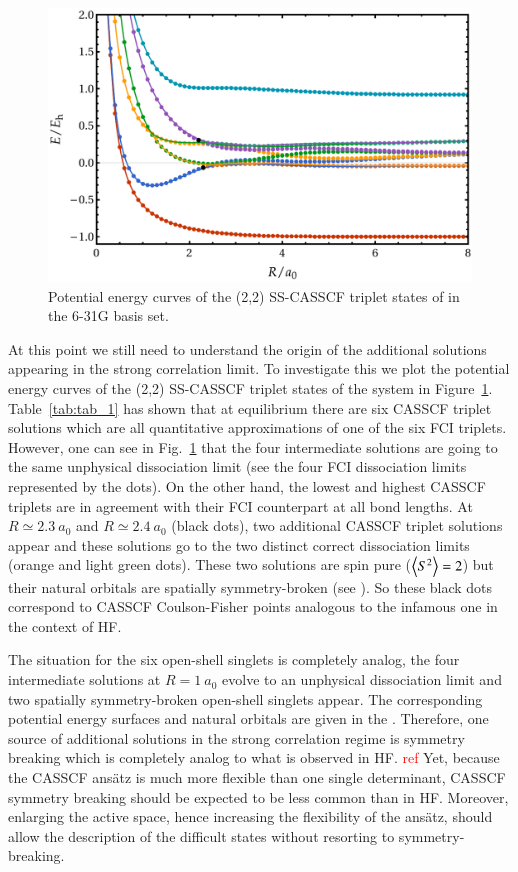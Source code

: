 \documentclass[aip,jcp,reprint,noshowkeys,superscriptaddress]{revtex4-1}
\newcommand{\todo}[1]{\textcolor{red}{#1}}
\begin{document}
\begin{figure}
  \centering
  \includegraphics[width=0.9\linewidth]{Figures/fig_6.pdf}
  \caption{Potential energy curves of the (2,2) SS-CASSCF triplet states of  in the 6-31G basis set. \label{fig:fig_8}}
\end{figure}

At this point we still need to understand the origin of the additional solutions appearing in the strong correlation limit.
To investigate this we plot the potential energy curves of the (2,2) SS-CASSCF triplet states of the system in Figure~\ref{fig:fig_8}.
Table~\ref{tab:tab_1} has shown that at equilibrium there are six CASSCF triplet solutions which are all quantitative approximations of one of the six FCI triplets.
However, one can see in Fig.~\ref{fig:fig_8} that the four intermediate solutions are going to the same unphysical dissociation limit (see the four FCI dissociation limits represented by the dots).
On the other hand, the lowest and highest CASSCF triplets are in agreement with their FCI counterpart at all bond lengths.
At $R\simeq 2.3~a_0$ and $R\simeq 2.4~a_0$ (black dots), two additional CASSCF triplet solutions appear and these solutions go to the two distinct correct dissociation limits (orange and light green dots).
These two solutions are spin pure ($\expval{S^2}=2$) but their natural orbitals are spatially symmetry-broken (see \SupInf).
So these black dots correspond to CASSCF Coulson-Fisher points analogous to the infamous one in the context of HF.

The situation for the six open-shell singlets is completely analog, \ie the four intermediate solutions at $R=1~a_0$ evolve to an unphysical dissociation limit and two spatially symmetry-broken open-shell singlets appear.
The corresponding potential energy surfaces and natural orbitals are given in the \SupInf.
Therefore, one source of additional solutions in the strong correlation regime is symmetry breaking which is completely analog to what is observed in HF. \todo{ref}
Yet, because the CASSCF ans\"atz is much more flexible than one single determinant, CASSCF symmetry breaking should be expected to be less common than in HF.
Moreover, enlarging the active space, hence increasing the flexibility of the ans\"atz, should allow the description of the difficult states without resorting to symmetry-breaking.
\end{document}
